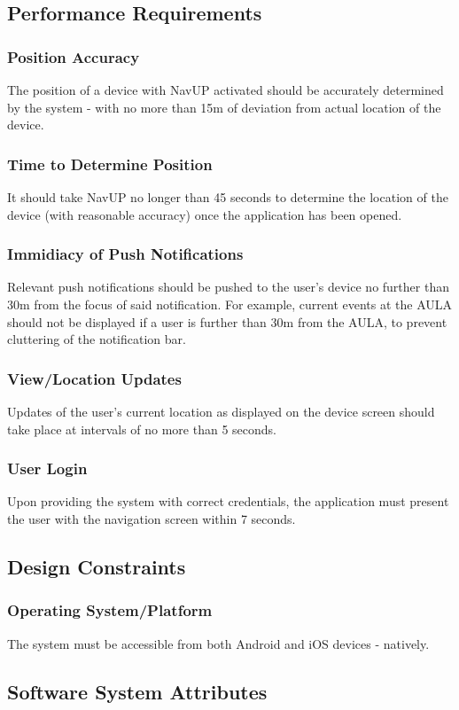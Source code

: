 \documentclass[12pt, a4paper]{article}
\begin{document}
	\subsection{Performance Requirements}
		\subsubsection{Position Accuracy} The position of a device with NavUP activated should be accurately determined by the system - with no more than 15m of deviation from actual location of the device.
		\subsubsection{Time to Determine Position} It should take NavUP no longer than 45 seconds to determine the location of the device (with reasonable accuracy) once the application has been opened.
		\subsubsection{Immidiacy of Push Notifications} Relevant push notifications should be pushed to the user's device no further than 30m from the focus of said notification. For example, current events at the AULA should not be displayed if a user is further than 30m from the AULA, to prevent cluttering of the notification bar.
		\subsubsection{View/Location Updates} Updates of the user's current location as displayed on the device screen should take place at intervals of no more than 5 seconds.
		\subsubsection{User Login} Upon providing the system with correct credentials, the application must present the user with the navigation screen within 7 seconds. 
	\subsection{Design Constraints}
		\subsubsection{Operating System/Platform} The system must be accessible from both Android and iOS devices - natively.		
	\subsection{Software System Attributes}
\end{document}
